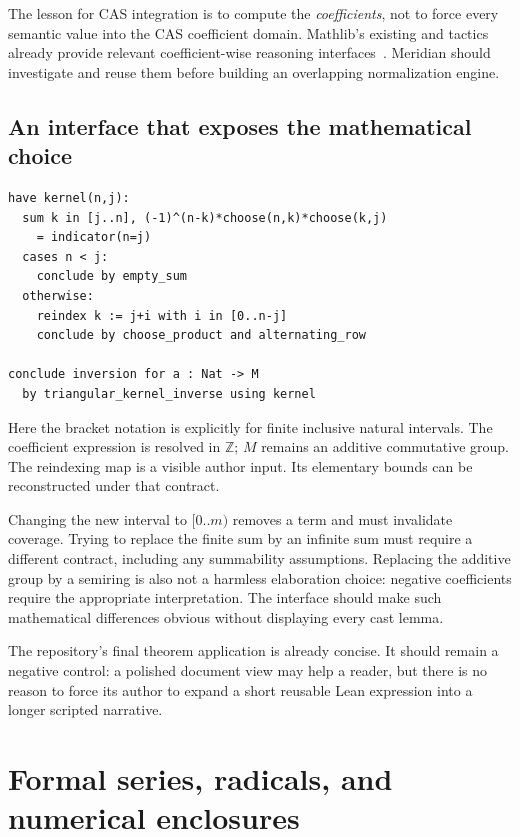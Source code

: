 \documentclass[11pt,a4paper]{article}
\newcommand{\code}[1]{\texttt{\detokenize{#1}}}
\newcommand{\Z}{\mathbb Z}
\theoremstyle{remark}
\begin{document}
The lesson for CAS integration is to compute the \emph{coefficients}, not to
force every semantic value into the CAS coefficient domain. Mathlib's existing
\code{match_scalars} and \code{module} tactics already provide relevant
coefficient-wise reasoning interfaces~\cite{module}. Meridian should investigate
and reuse them before building an overlapping normalization engine.

\subsection{An interface that exposes the mathematical choice}
\par\smallskip\noindent\begin{minipage}{\linewidth}
\begin{lstlisting}
have kernel(n,j):
  sum k in [j..n], (-1)^(n-k)*choose(n,k)*choose(k,j)
    = indicator(n=j)
  cases n < j:
    conclude by empty_sum
  otherwise:
    reindex k := j+i with i in [0..n-j]
    conclude by choose_product and alternating_row

conclude inversion for a : Nat -> M
  by triangular_kernel_inverse using kernel
\end{lstlisting}
\end{minipage}\par\smallskip
Here the bracket notation is explicitly for finite inclusive natural intervals.
The coefficient expression is resolved in $\Z$; $M$ remains an additive
commutative group. The reindexing map is a visible author input. Its elementary
bounds can be reconstructed under that contract.

Changing the new interval to $[0..m)$ removes a term and must invalidate coverage.
Trying to replace the finite sum by an infinite sum must require a different
contract, including any summability assumptions. Replacing the additive group by
a semiring is also not a harmless elaboration choice: negative coefficients
require the appropriate interpretation. The interface should make such
mathematical differences obvious without displaying every cast lemma.

The repository's final theorem application is already concise. It should remain
a negative control: a polished document view may help a reader, but there is no
reason to force its author to expand a short reusable Lean expression into a
longer scripted narrative.

\section{Formal series, radicals, and numerical enclosures}
\label{sec:other}
\end{document}
